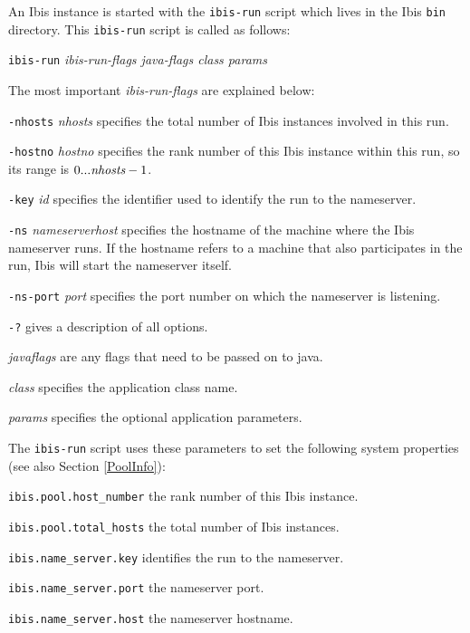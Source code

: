 \documentclass[10pt]{article}
\begin{document}
An Ibis instance is started with the \texttt{ibis-run} script which
lives in the Ibis \texttt{bin} directory.  This \texttt{ibis-run}
script is called as follows:
\begin{center}
\texttt{ibis-run} \emph{ibis-run-flags java-flags class params}
\end{center}
The most important \emph{ibis-run-flags} are explained below:
\begin{description}
\item{\texttt{-nhosts} \emph{nhosts}}
specifies the total number of Ibis instances involved in this run.
\item{\texttt{-hostno} \emph{hostno}}
specifies the rank number of this Ibis instance within this run,
so its range is $0 ... \emph{nhosts}-1$.
\item{\texttt{-key} \emph{id}}
specifies the identifier used to identify the run to the nameserver.
\item{\texttt{-ns} \emph{nameserverhost}}
specifies the hostname of the machine where the Ibis nameserver runs.
If the hostname refers to a machine that also participates in the run,
Ibis will start the nameserver itself.
\item{\texttt{-ns-port} \emph{port}}
specifies the port number on which the nameserver is listening.
\item{\texttt{-?}}
gives a description of all options.
\item{\emph{javaflags}}
are any flags that need to be passed on to java.
\item{\emph{class}}
specifies the application class name.
\item{\emph{params}}
specifies the optional application parameters.
\end{description}

The \texttt{ibis-run} script uses these parameters to set the following
system properties (see also Section \ref{PoolInfo}):
\begin{description}
\item{\texttt{ibis.pool.host\_number}}
the rank number of this Ibis instance.
\item{\texttt{ibis.pool.total\_hosts}}
the total number of Ibis instances.
\item{\texttt{ibis.name\_server.key}}
identifies the run to the nameserver.
\item{\texttt{ibis.name\_server.port}}
the nameserver port.
\item{\texttt{ibis.name\_server.host}}
the nameserver hostname.
\end{description}
\end{document}

